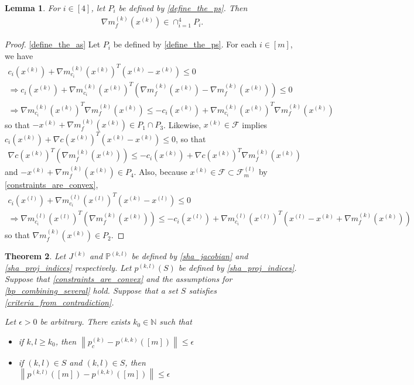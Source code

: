 \documentclass{article}
\newtheorem{theorem}{Theorem}[section]
\newtheorem{lemma}[theorem]{Lemma}
\theoremstyle{case}
\numberwithin{theorem}{subsection}
\newcommand{\feasiblel}{{\mathcal F_m^{(l)}}}
\newcommand{\feasible}{{\mathcal F}}
\newcommand{\gk}{{\nabla m_f^{(k)}\left(\xk\right)}}
\newcommand{\gmcik}{{\nabla m_{c_i}^{(k)}\left(\xk\right)}}
\newcommand{\gmcil}{{\nabla m_{c_i}^{(l)}\left(\xl\right)}}
\newcommand{\naturals}{\mathbb N}
\newcommand{\xk}{x^{(k)}}
\newcommand{\xl}{{x^{(l)}}}
\newcommand{\projkl}{{p^{(k,l)}}}
\newcommand{\projkk}{{p^{(k,k)}}}
\newcommand{\trueprojk}{{p_c^{(k)}}}
\newcommand{\activeprojkl}{{\mathbb P^{(k, l)}}}
\newcommand{\jackk}{{J^{(k)}}}
\begin{document}
\begin{lemma}
\label{the_gradient_is_in_em_all}
For $i \in [4]$, let $P_i$ be defined by \cref{define_the_ps}.
Then
\begin{align*}
\gk \in \cap_{i = 1}^4 P_i.
\end{align*}
\end{lemma}
\begin{proof}

\cref{define_the_as}
Let $P_i$ be defined by \cref{define_the_ps}.
For each $i \in [m]$, we have
\begin{align*}
c_i\left(\xk\right) + \gmcik^T \left(\xk - \xk\right)  \le 0 \\
\Longrightarrow c_i\left(\xk\right) + \gmcik^T \left(\gk - \gk \right)  \le 0 \\
\Longrightarrow \gmcik^T \gk  \le -c_i\left(\xk\right) + \gmcik^T\gk
\end{align*}
so that $-\xk + \gk \in P_1 \cap P_3$.
Likewise, $\xk \in \feasible$ implies $c_i\left(\xk\right) + \nabla c\left(\xk\right)^T \left(\xk-\xk\right)  \le 0$, so that
\begin{align*}
\nabla c\left(\xk\right)^T \left(\gk\right)  \le -c_i\left(\xk\right) + \nabla c\left(\xk\right)^T\gk
\end{align*}
and $-\xk + \gk \in P_4$.
Also, because $\xk \in \feasible \subset \feasiblel$ by \cref{constraints_are_convex},
\begin{align*}
c_i\left(\xl\right) + \gmcil^T \left(\xk - \xl\right) \le 0 \\
\Longrightarrow \gmcil^T \left(\gk\right) \le -c_i\left(\xl\right) + \gmcil^T\left(\xl - \xk + \gk\right)
\end{align*}
so that $\gk \in P_2$.
\end{proof}









\begin{theorem}
\label{bounded_projection_theorem}
Let $\jackk$ and $\activeprojkl$ be defined by \cref{sha_jacobian} and \cref{sha_proj_indices} respectively.
Let
$\projkl(S)$
be defined by
\cref{sha_proj_indices}.
Suppose that 
\cref{constraints_are_convex}
and the assumptions for
\cref{bp_combining_several}
hold.
Suppose that a set $S$ satisfies \cref{criteria_from_contradiction}.

Let $\epsilon > 0$ be arbitrary.
There exists $k_0 \in \naturals$ such that 
\begin{itemize}
\item if $k, l \ge k_0$, then
$\left\| \trueprojk - \projkk\left([m]\right) \right\| \le \epsilon$
\item if $(k, l) \in S$ and $(k, l) \in S$, then
$\left\| \projkl\left([m]\right) - \projkk\left([m]\right) \right\| \le \epsilon$
\end{itemize}
\end{theorem}
\end{document}
